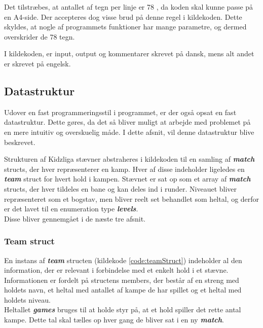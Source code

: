Det tilstræbes, at antallet af tegn per linje er 78 \cite{codingstyle}, da koden skal kunne passe på en A4-side. Der accepteres dog visse brud på denne regel i kildekoden. Dette skyldes, at nogle af programmets funktioner har mange parametre, og dermed overskrider de 78 tegn. 
\par
I kildekoden, er input, output og kommentarer skrevet på dansk, mens alt andet er skrevet på engelsk.

\subsection*{Datastruktur}
Udover en fast programmeringsstil i programmet, er der også opsat en fast datastruktur. Dette gøres, da det så bliver muligt at arbejde med problemet på en mere intuitiv og overskuelig måde. I dette afsnit, vil denne datastruktur blive beskrevet.
\par
Strukturen af Kidzliga stævner abstraheres i kildekoden til en samling af \textbf{\textit{match}} structs, der hver repræsenterer en kamp. Hver af disse indeholder ligeledes en \textbf{\textit{team}} struct for hvert hold i kampen. Stævnet er sat op som et array af \textbf{\textit{match}} structs, der hver tildeles en bane og kan deles ind i runder. Niveauet bliver repræsenteret som et bogstav, men bliver reelt set behandlet som heltal, og derfor er det lavet til en enumeration type \textbf{\textit{levels}}.\\
Disse bliver gennemgået i de næste tre afsnit.


\subsubsection{Team struct}
En instans af \textbf{\textit{team}} structen (kildekode \ref{code:teamStruct}) indeholder al den information, der er relevant i forbindelse med et enkelt hold i et stævne. \\
Informationen er fordelt på structens members, der består af en streng med holdets navn, et heltal med antallet af kampe de har spillet og et heltal med holdets niveau.\\
Heltallet \textbf{\textit{games}} bruges til at holde styr på, at et hold spiller det rette antal kampe. Dette tal skal tælles op hver gang de bliver sat i en ny \textbf{\textit{match}}.

